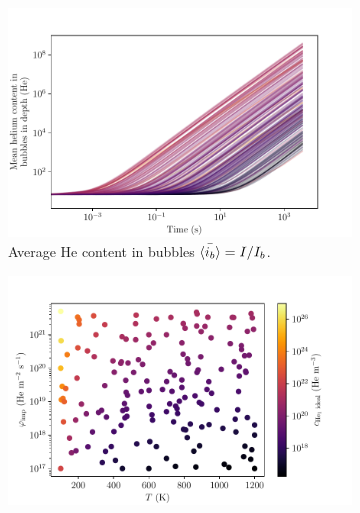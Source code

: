 \begin{figure} [ht!]
    \begin{subfigure}{0.5\linewidth}
        \centering
        \includegraphics[width=\linewidth]{Figures/Chapter4/parametric study/mean_ib_time.pdf}
        \caption{Average He content in bubbles $\Bar{\langle i_b \rangle} = I / I_b$.}
    \end{subfigure}%
    \begin{subfigure}{0.5\linewidth}
        \centering
        \includegraphics[width=\linewidth]{Figures/Chapter4/parametric study/points_with_parameter.pdf}

\end{subfigure}
\end{figure}
